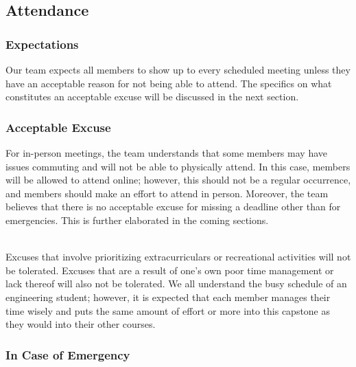 \documentclass{article}
\begin{document}
\subsection*{Attendance}

\subsubsection*{Expectations}


Our team expects all members to show up to every scheduled meeting unless they
 have an acceptable reason for not being able to attend. The specifics on what 
 constitutes an acceptable excuse will be discussed in the next section.

\subsubsection*{Acceptable Excuse}


For in-person meetings, the team understands that some members may have issues
 commuting and will not be able to physically attend. In this case, members 
 will be allowed to attend online; however, this should not be a regular 
 occurrence, and members should make an effort to attend in person. 
 Moreover, the team believes that there is no acceptable excuse for missing
 a deadline other than for emergencies. 
 This is further elaborated in the coming sections. 

\\Excuses that involve prioritizing extracurriculars or recreational activities will not be tolerated.
Excuses that are a result of one's own poor time management or lack thereof will also not be tolerated.
We all understand the busy schedule of an engineering student; however, it is expected that each member manages their time wisely and puts the same amount of effort or more into this capstone as they would into their other courses.



\subsubsection*{In Case of Emergency}
\end{document}
